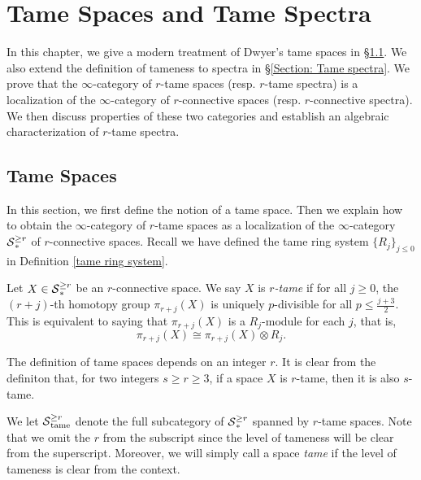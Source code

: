 \chapter{Tame Spaces and Tame Spectra}
In this chapter, we give a modern treatment of Dwyer's tame spaces in \S \ref{Section Tame spaces}. We also extend the definition of tameness to spectra in \S \ref{Section: Tame spectra}.
We prove that the $\infty$-category of $r$-tame spaces (resp. $r$-tame spectra) is a localization of the $\infty$-category of $r$-connective spaces (resp. $r$-connective spectra).
We then discuss properties of these two categories and establish an algebraic characterization of $r$-tame spectra.

\section{Tame Spaces}
\label{Section Tame spaces}
In this section, we first define the notion of a tame space.
Then we explain how to obtain the $\infty$-category of $r$-tame spaces as a localization of the $\infty$-category $\operatorname{\mathcal{S}}_{*}^{\geq r}$ of $r$-connective spaces.
Recall we have defined the tame ring system $\{R_{j}\}_{j \leq 0}$ in Definition \ref{tame ring system}.

\begin{definition}
	\label{Tame spaces}
	Let $X\in \operatorname{\mathcal{S}}_{*}^{\geq r}$ be an $r$-connective space.
	We say $X$ is \emph{$r$-tame} if for all $j\geq 0$, the $(r+j)$-th homotopy group $\pi_{r+j}(X)$ is uniquely $p$-divisible for all $p\leq \frac{j+3}{2}$. 
	This is equivalent to saying that $\pi_{r+j}(X)$ is a $R_j$-module for each $j$, that is,
	\[
	\pi_{r+j}(X)\cong \pi_{r+j}(X)\otimes R_{j}.
	\]
\end{definition}

    \begin{remark}
        The definition of tame spaces depends on an integer $r$.
        It is clear from the definiton that,
        for two integers $s\geq r \geq 3$, if a space $X$ is $r$-tame, then it is also $s$-tame. 
    \end{remark}
    
    \begin{notation}
        We let $\operatorname{\mathcal{S}}^{\geq r}_{\operatorname{\operatorname{tame}}}$ denote the full subcategory of $\operatorname{\mathcal{S}}^{\geq r}_{*}$ spanned by $r$-tame spaces.
       Note that we omit the $r$ from the subscript since the level of tameness will be clear from the superscript.
       Moreover, we will simply call a space \emph{tame} if the level of tameness is clear from the context.
    \end{notation}
    


